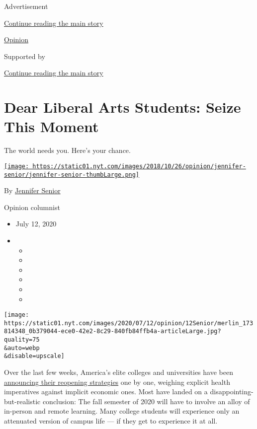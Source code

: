 Advertisement

\protect\hyperlink{after-top}{Continue reading the main story}

\href{/section/opinion}{Opinion}

Supported by

\protect\hyperlink{after-sponsor}{Continue reading the main story}

\hypertarget{dear-liberal-arts-students-seize-this-moment}{%
\section{Dear Liberal Arts Students: Seize This
Moment}\label{dear-liberal-arts-students-seize-this-moment}}

The world needs you. Here's your chance.

\href{https://www.nytimes.com/by/jennifer-senior}{\texttt{[image: https://static01.nyt.com/images/2018/10/26/opinion/jennifer-senior/jennifer-senior-thumbLarge.png]}}

By \href{https://www.nytimes.com/by/jennifer-senior}{Jennifer Senior}

Opinion columnist

\begin{itemize}
\item
  July 12, 2020
\item
  \begin{itemize}
  \item
  \item
  \item
  \item
  \item
  \item
  \end{itemize}
\end{itemize}

\texttt{[image: https://static01.nyt.com/images/2020/07/12/opinion/12Senior/merlin\_173814348\_0b379044-ece0-42e2-8c29-840fb84ffb4a-articleLarge.jpg?quality=75\\\&auto=webp\\\&disable=upscale]}

Over the last few weeks, America's elite colleges and universities have
been
\href{https://www.washingtonpost.com/education/2020/07/06/harvard-reopen-with-fewer-than-half-undergrads-campus-because-coronavirus/}{announcing
their reopening strategies} one by one, weighing explicit health
imperatives against implicit economic ones. Most have landed on a
disappointing-but-realistic conclusion: The fall semester of 2020 will
have to involve an alloy of in-person and remote learning. Many college
students will experience only an attenuated version of campus life ---
if they get to experience it at all.


